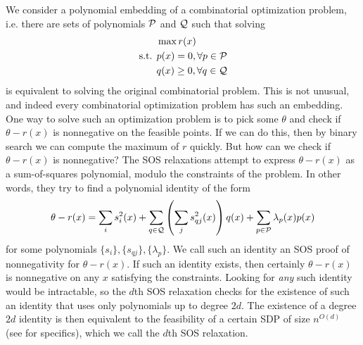 We consider a polynomial embedding of a combinatorial optimization problem, i.e. there are sets of polynomials $\mathcal P$ and $\mathcal Q$ such that solving
\begin{align*}
&\max r(x) \\
\text{s.t. } &p(x) = 0, \forall p \in \mathcal P \\
&q(x) \geq 0, \forall q \in \mathcal Q
\end{align*}
is equivalent to solving the original combinatorial problem. This is not unusual, and indeed every combinatorial optimization problem has such an embedding. One way to solve such an optimization problem is to pick some $\theta$ and check if $\theta - r(x)$ is nonnegative on the feasible points. If we can do this, then by binary search we can compute the maximum of $r$ quickly. But how can we check if $\theta - r(x)$ is nonnegative? The SOS relaxations attempt to express $\theta - r(x)$ as a sum-of-squares polynomial, modulo the constraints of the problem. In other words, they try to find a polynomial identity of the form
\[\theta - r(x) = \sum_i s_i^2(x) + \sum_{q \in \mathcal Q} \left(\sum_j s_{qj}^2(x)\right)q(x) + \sum_{p\in\mathcal P} \lambda_p(x)p(x)\label{eq:intro_sos_proof}\]
for some polynomials $\{s_i\}, \{s_{qj}\}, \{\lambda_p\}$.
We call such an identity an SOS proof of nonnegativity for $\theta - r(x)$.
If such an identity exists, then certainly $\theta - r(x)$ is nonnegative on any $x$ satisfying the constraints. Looking for \emph{any} such identity would be intractable, so the $d$th SOS relaxation checks for the existence of such an identity that uses only polynomials up to degree $2d$. The existence of a degree $2d$ identity is then equivalent to the feasibility of a certain SDP of size $n^{O(d)}$ (see  for specifics), which we call the $d$th SOS relaxation.

